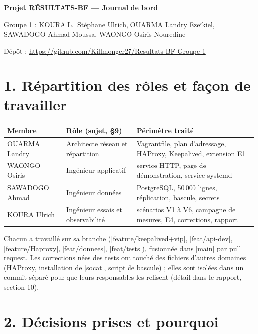 \documentclass[a4paper,10pt]{article}
\begin{document}
{\centering
{\Large\bfseries Projet RÉSULTATS-BF --- Journal de bord\par}
\vspace{0.2em}
Groupe 1 : KOURA L.\ Stéphane Ulrich, OUARMA Landry Ezeïkiel, SAWADOGO Ahmad Moussa, WAONGO Osiris Nouredine\par
Dépôt : \url{https://github.com/Killmonger27/Resultats-BF-Groupe-1}\par}

\section*{1. Répartition des rôles et façon de travailler}

\small
\begin{tabular}{@{}L{2.9cm}L{3.6cm}L{8.9cm}@{}}
\toprule
\textbf{Membre} & \textbf{Rôle (sujet, §9)} & \textbf{Périmètre traité}\\
\midrule
OUARMA Landry & Architecte réseau et répartition & Vagrantfile, plan d'adressage, HAProxy, Keepalived, extension E1\\
WAONGO Osiris & Ingénieur applicatif & service HTTP, page de démonstration, service systemd\\
SAWADOGO Ahmad & Ingénieur données & PostgreSQL, 50\,000 lignes, réplication, bascule, secrets\\
KOURA Ulrich & Ingénieur essais et observabilité & scénarios V1 à V6, campagne de mesures, E4, corrections, rapport\\
\bottomrule
\end{tabular}
\normalsize

Chacun a travaillé sur sa branche (|feature/keepalived+vip|, |feat/api-dev|, |feature/Haproxy|, |feat/donnees|, |feat/tests|), fusionnée dans |main| par pull request. Les corrections nées des tests ont touché des fichiers d'autres domaines (HAProxy, installation de |socat|, script de bascule) ; elles sont isolées dans un commit séparé pour que leurs responsables les relisent (détail dans le rapport, section 10).

\section*{2. Décisions prises et pourquoi}
\end{document}
